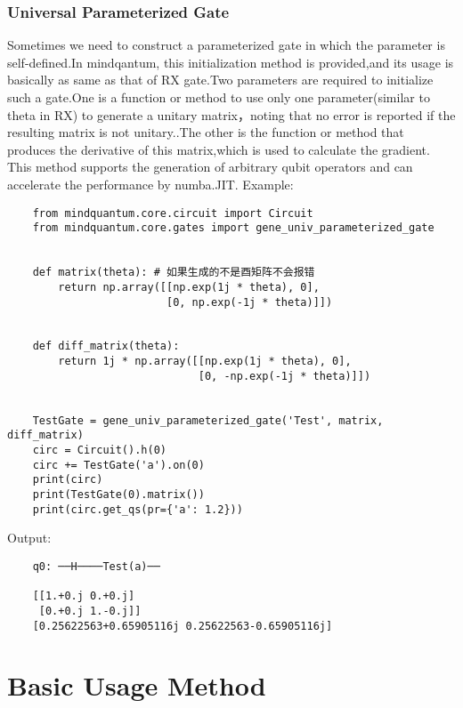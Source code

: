 \subsubsection{Universal Parameterized Gate}
Sometimes we need to construct a parameterized gate in which the parameter is self-defined.In mindqantum, this initialization method is provided,and its usage is basically as same as that of RX gate.Two parameters are required to initialize such a gate.One is a function or method to use only one parameter(similar to theta in RX) to generate a unitary matrix，noting that no error is reported if the resulting matrix is not unitary..The other is the function or method that produces the derivative of this matrix,which is used to calculate the gradient. This method supports the generation of arbitrary qubit operators and can accelerate the performance by numba.JIT.
Example:
\begin{lstlisting}
    from mindquantum.core.circuit import Circuit
    from mindquantum.core.gates import gene_univ_parameterized_gate
    
    
    def matrix(theta): # 如果生成的不是酉矩阵不会报错
        return np.array([[np.exp(1j * theta), 0],
                         [0, np.exp(-1j * theta)]])
    
    
    def diff_matrix(theta):
        return 1j * np.array([[np.exp(1j * theta), 0],
                              [0, -np.exp(-1j * theta)]])
    
    
    TestGate = gene_univ_parameterized_gate('Test', matrix, diff_matrix)
    circ = Circuit().h(0)
    circ += TestGate('a').on(0)
    print(circ)
    print(TestGate(0).matrix())
    print(circ.get_qs(pr={'a': 1.2}))
\end{lstlisting}
Output:
\begin{lstlisting}
    q0: ──H────Test(a)──

    [[1.+0.j 0.+0.j]
     [0.+0.j 1.-0.j]]
    [0.25622563+0.65905116j 0.25622563-0.65905116j]
\end{lstlisting}

\section{Basic Usage Method}
